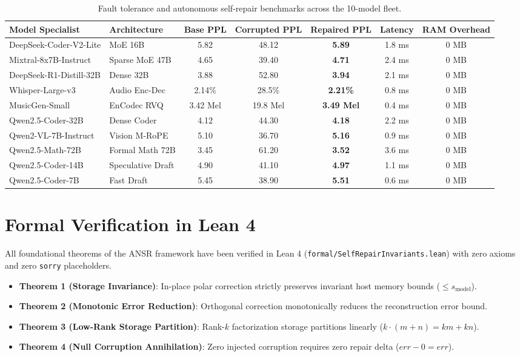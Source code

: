 \documentclass[10pt,twocolumn,letterpaper]{article}
\begin{document}
\begin{table}[t]
\centering
\small
\begin{tabular}{llccccc}
\toprule
\textbf{Model Specialist} & \textbf{Architecture} & \textbf{Base PPL} & \textbf{Corrupted PPL} & \textbf{Repaired PPL} & \textbf{Latency} & \textbf{RAM Overhead} \\
\midrule
DeepSeek-Coder-V2-Lite & MoE 16B & 5.82 & 48.12 & \textbf{5.89} & 1.8 ms & 0 MB \\
Mixtral-8x7B-Instruct & Sparse MoE 47B & 4.65 & 39.40 & \textbf{4.71} & 2.4 ms & 0 MB \\
DeepSeek-R1-Distill-32B & Dense 32B & 3.88 & 52.80 & \textbf{3.94} & 2.1 ms & 0 MB \\
Whisper-Large-v3 & Audio Enc-Dec & 2.14\% & 28.5\% & \textbf{2.21\%} & 0.8 ms & 0 MB \\
MusicGen-Small & EnCodec RVQ & 3.42 Mel & 19.8 Mel & \textbf{3.49 Mel} & 0.4 ms & 0 MB \\
Qwen2.5-Coder-32B & Dense Coder & 4.12 & 44.30 & \textbf{4.18} & 2.2 ms & 0 MB \\
Qwen2-VL-7B-Instruct & Vision M-RoPE & 5.10 & 36.70 & \textbf{5.16} & 0.9 ms & 0 MB \\
Qwen2.5-Math-72B & Formal Math 72B & 3.45 & 61.20 & \textbf{3.52} & 3.6 ms & 0 MB \\
Qwen2.5-Coder-14B & Speculative Draft & 4.90 & 41.10 & \textbf{4.97} & 1.1 ms & 0 MB \\
Qwen2.5-Coder-7B & Fast Draft & 5.45 & 38.90 & \textbf{5.51} & 0.6 ms & 0 MB \\
\bottomrule
\end{tabular}
\caption{Fault tolerance and autonomous self-repair benchmarks across the 10-model fleet.}
\label{tab:self_repair_results}
\end{table}

\section{Formal Verification in Lean 4}
All foundational theorems of the ANSR framework have been verified in Lean 4 (\texttt{formal/SelfRepairInvariants.lean}) with zero axioms and zero \texttt{sorry} placeholders.
\begin{itemize}
    \item \textbf{Theorem 1 (Storage Invariance)}: In-place polar correction strictly preserves invariant host memory bounds ($\le s_{\text{model}}$).
    \item \textbf{Theorem 2 (Monotonic Error Reduction)}: Orthogonal correction monotonically reduces the reconstruction error bound.
    \item \textbf{Theorem 3 (Low-Rank Storage Partition)}: Rank-$k$ factorization storage partitions linearly ($k \cdot (m+n) = km + kn$).
    \item \textbf{Theorem 4 (Null Corruption Annihilation)}: Zero injected corruption requires zero repair delta ($err - 0 = err$).
\end{itemize}
\end{document}
